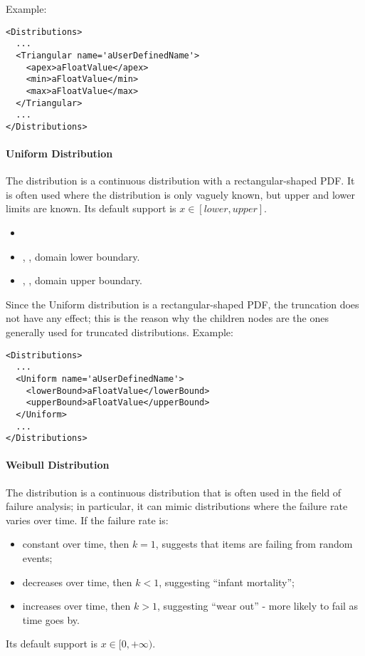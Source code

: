 Example:
\begin{lstlisting}[style=XML]
<Distributions>
  ...
  <Triangular name='aUserDefinedName'>
    <apex>aFloatValue</apex>
    <min>aFloatValue</min>
    <max>aFloatValue</max>
  </Triangular>
  ...
</Distributions>
\end{lstlisting}

\paragraph{Uniform Distribution}
\label{Uniform}
The  distribution is a continuous distribution with a
rectangular-shaped PDF.
%
It is often used where the distribution is only vaguely known, but upper and
lower limits are known.
%
Its default support is $x \in [lower,upper]$.

%
\attrIntro
\vspace{-5mm}
\begin{itemize}
  \itemsep0em
  \item \nameDescription
\end{itemize}
\vspace{-5mm}
\subnodesIntro
\begin{itemize}
  \item {}, , domain lower
  boundary.
  \item {}, , domain upper
  boundary.
\end{itemize}
\nb Since the Uniform distribution is a rectangular-shaped PDF, the truncation does not have any effect;
 this is the reason why the children nodes are the ones generally used for truncated distributions.
Example:
\begin{lstlisting}[style=XML]
<Distributions>
  ...
  <Uniform name='aUserDefinedName'>
    <lowerBound>aFloatValue</lowerBound>
    <upperBound>aFloatValue</upperBound>
  </Uniform>
  ...
</Distributions>
\end{lstlisting}

\paragraph{Weibull Distribution}
\label{Weibull}
The  distribution is a continuous distribution that is often
used in the field of failure analysis; in particular, it can mimic distributions
where the failure rate varies over time.
%
If the failure rate is:
\vspace{-5mm}
\begin{itemize}
  \itemsep0em
  \item constant over time, then $k = 1$, suggests that items are failing from
  random events;
  \item decreases over time, then $k < 1$, suggesting ``infant mortality'';
  \item increases over time, then $k > 1$, suggesting ``wear out'' - more likely
  to fail as time goes by.
\end{itemize}
\vspace{-5mm}
Its default support is $x \in [0, +\infty)$.

